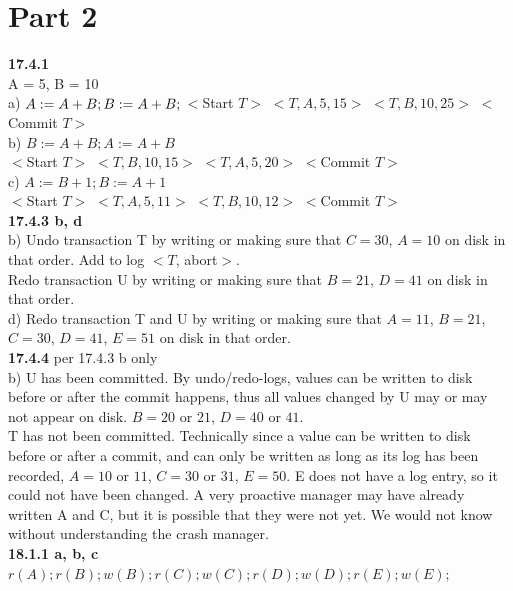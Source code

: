 \documentclass[12pt, letterpaper, fleqn]{article}
\begin{document}
  \section{Part 2} 
  \textbf{17.4.1} \\
  A = 5, B = 10 \\
  a) $A := A+B; B := A+B; \\
  $$<$Start $T>$ $<T,A,5,15>$ $<T,B,10,25>$ $<$Commit $T>$ \\
  b) $B:=A+B; A:=A+B$\\
  $<$Start $T>$ $<T,B,10,15>$ $<T,A,5,20>$ $<$Commit $T>$ \\
  c) $A:=B+1; B:=A+1$\\
  $<$Start $T>$ $<T,A,5,11>$ $<T,B,10,12>$ $<$Commit $T>$ \\


  \textbf{17.4.3 b, d} \\
  b) Undo transaction T by writing or making sure that $C=30$, $A=10$ on disk in
  that order.
  Add to log $<T$, abort$>$. \\
  Redo transaction U by writing or making sure that $B=21$, $D=41$ on disk in
  that order. \\
  d) Redo transaction T and U by writing or making sure that $A=11$, $B=21$,
  $C=30$, $D=41$, $E=51$ on
  disk in that order. \\

  \textbf{17.4.4} per 17.4.3 b only \\ 
  b) U has been committed. By undo/redo-logs, values can be written to disk
  before or after the commit happens, thus all values changed by U may or may
  not appear on disk. $B=20$ or $21$, $D=40$ or $41$.\\
  T has not been committed. Technically since a value can be written to disk
  before or after a commit, and can only be written as long as its log has been
  recorded, $A=10$ or $11$, $C=30$ or $31$, $E=50$. E does not have a log entry,
  so it could not have been changed. A very proactive manager may have already
  written A and C, but it is possible that they were not yet. We would not know
  without understanding the crash manager. \\
  

  \textbf{18.1.1 a, b, c} \\
  $r(A);r(B);w(B);r(C);w(C);r(D);w(D);r(E);w(E);$\\
\end{document}
